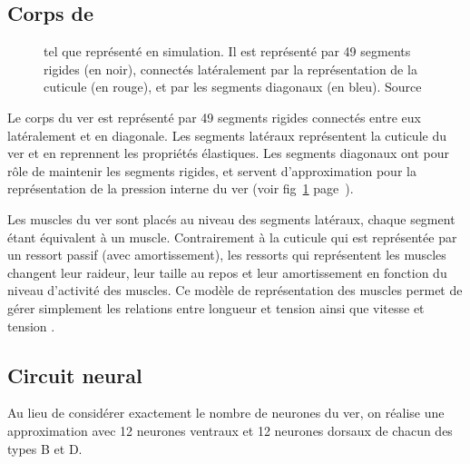 \subsection{Corps de \celeg{}} %
\label{sub:Corps de celeg}

\begin{figure}[ht]
   \begin{center}
   \end{center}
   \caption[Représentation de \celeg{} en simulation]{\celeg{} tel que représenté en simulation. Il est représenté
   par 49 segments rigides (en noir), connectés latéralement par la représentation
   de la cuticule (en rouge), et par les segments diagonaux (en bleu). Source \boylecite{}}
   \label{fig:celegans_representation}
\end{figure}

Le corps du ver est représenté par 49 segments rigides connectés entre eux
latéralement et en diagonale. Les segments latéraux représentent la cuticule du
ver et en reprennent les propriétés élastiques. Les segments diagonaux ont pour
rôle de maintenir les segments rigides, et servent d'approximation pour la
représentation de la pression interne du ver (voir
fig~\ref{fig:celegans_representation}
page~\pageref{fig:celegans_representation}).

Les muscles du ver sont placés au niveau des segments latéraux, chaque segment
étant équivalent à un muscle. Contrairement à la cuticule qui est représentée par un
ressort passif (avec amortissement), les ressorts qui représentent les muscles
changent leur raideur, leur taille au repos et leur amortissement en fonction du niveau
d'activité des muscles. Ce modèle de représentation des muscles permet de gérer
simplement les relations entre longueur et tension ainsi que vitesse et tension
\cite{Boyle2009}.


\subsection{Circuit neural} %
\label{sub:Circuit neural}

Au lieu de considérer exactement le nombre de neurones du ver, on réalise une
approximation avec 12 neurones ventraux et 12 neurones dorsaux de chacun des types
B et D.

